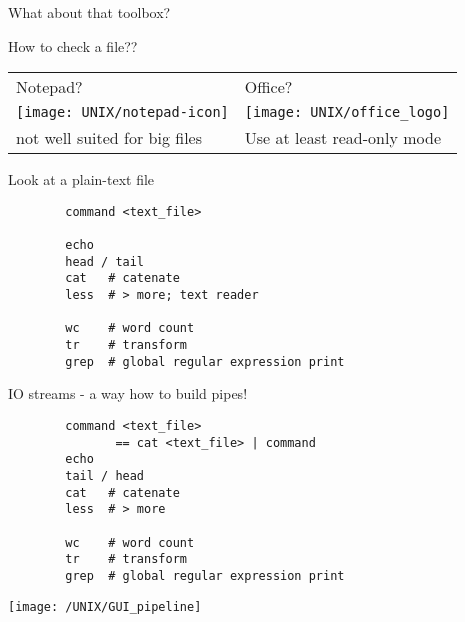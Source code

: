 \documentclass[xcolor=dvipsnames]{beamer}
\begin{document}
\begin{frame}
	\Huge
	\begin{center}
		What about that toolbox?	
	\end{center}
\end{frame}

\begin{frame}
	\begin{center}
	\huge
	How to check a file?? \\
	\vspace{1cm}
	
	\Large
	\begin{tabular}{C{0.4\textwidth}C{0.4\textwidth}}
	Notepad? & Office? \\
	\texttt{[image: UNIX/notepad-icon]} & \texttt{[image: UNIX/office\_logo]} \\
	\small not well suited for big files & \small Use at least read-only mode\\
	\end{tabular}
	\end{center}
\end{frame}

\begin{frame}[fragile]
	\huge
	Look at a plain-text file
	\Large
	\begin{verbatim}
		command <text_file>	
	
		echo
		head / tail 
		cat   # catenate
		less  # > more; text reader
		
		wc    # word count
		tr    # transform
		grep  # global regular expression print 
	\end{verbatim}
\end{frame}

\begin{frame}[fragile]
	\huge
	IO streams - a way how to build pipes!
	\Large
	\begin{verbatim}
		command <text_file> 
	           == cat <text_file> | command
		echo
		tail / head
		cat   # catenate
		less  # > more
		
		wc    # word count
		tr    # transform
		grep  # global regular expression print 
	\end{verbatim}
\end{frame}

\begin{frame}
	\begin{center}
		\texttt{[image: /UNIX/GUI\_pipeline]}
	\end{center}
\end{frame}
\end{document}
